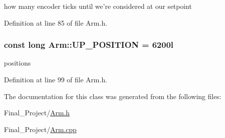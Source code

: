 how many encoder ticks until we're considered at our setpoint 



Definition at line 85 of file Arm.\-h.

\hypertarget{classArm_a44fed3661f22f9acd7f3cd8635a4fc6a}{
\subsubsection[{U\-P\-\_\-\-P\-O\-S\-I\-T\-I\-O\-N}]{\setlength{\rightskip}{0pt plus 5cm}const long Arm\-::\-U\-P\-\_\-\-P\-O\-S\-I\-T\-I\-O\-N = 6200l\hspace{0.3cm}{\ttfamily [private]}}}\label{classArm_a44fed3661f22f9acd7f3cd8635a4fc6a}
positions 

Definition at line 99 of file Arm.\-h.



The documentation for this class was generated from the following files\-:\begin{DoxyCompactItemize}
\item 
Final\-\_\-\-Project/\hyperlink{Arm_8h}{Arm.\-h}\item 
Final\-\_\-\-Project/\hyperlink{Arm_8cpp}{Arm.\-cpp}\end{DoxyCompactItemize}
